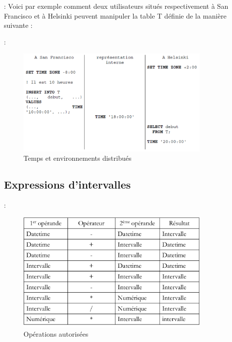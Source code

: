 \documentclass[10pt]{beamer}
\begin{document}
\begin{frame}{\secname : \subsecname}
    Voici par exemple comment deux utilisateurs situés respectivement à San Francisco et à Helsinki peuvent manipuler la table T définie de la manière suivante :
    
\end{frame}

\begin{frame}{\secname : \subsecname}
    \begin{figure}
        \begin{center}
            \includegraphics[width=0.85\textwidth]{../assets/img/time.png}
            \caption{Temps et environnements distribués}
        \end{center}
    \end{figure}
\end{frame}
\subsection{Expressions d'intervalles}
\begin{frame}{\secname : \subsecname}
    \begin{figure}
        \begin{center}
            \includegraphics[width=0.85\textwidth]{../assets/img/expressions-intervalles.pdf}
            \caption{Opérations autorisées}
        \end{center}
    \end{figure}
\end{frame}
\end{document}
